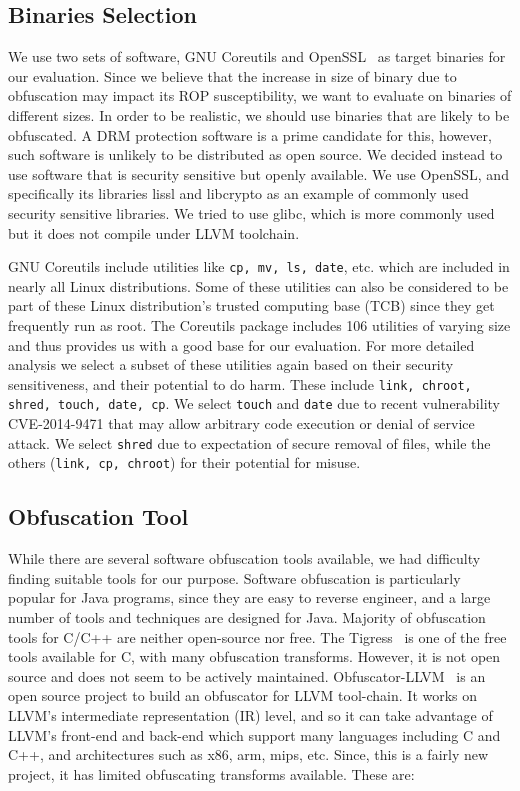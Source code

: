 \subsection{Binaries Selection}
\label{sec:sampleselect}
We use two sets of software, GNU Coreutils \cite{coreutilsdd} and 
OpenSSL~\cite{webOpenssl} as target binaries for our evaluation. Since we 
believe that the increase in size of binary due to obfuscation may impact 
its ROP susceptibility, we want to evaluate on binaries of different 
sizes. In order to be realistic, we should use binaries that are likely to 
be obfuscated. A DRM protection software is a prime candidate for this, 
however, such software is unlikely to be distributed as open source. We 
decided instead to use software that is security sensitive but openly 
available. We use OpenSSL, and specifically its libraries lissl and 
libcrypto as an example of commonly used security sensitive libraries. We 
tried to use glibc, which is more commonly used but it does not compile 
under LLVM toolchain. 

GNU Coreutils include utilities like \texttt{cp, mv, ls, date}, etc. which 
are included in nearly all Linux distributions. Some of these utilities 
can also be considered to be part of these Linux distribution's trusted 
computing base (TCB) since they get frequently run as root. The Coreutils 
package includes 106 utilities of varying size and thus provides us with a 
good base for our evaluation. For more detailed analysis we select a 
subset of these utilities again based on their security sensitiveness, and 
their potential to do harm. These include \texttt{link, chroot, shred, 
touch, date, cp}. We select \texttt{touch} and \texttt{date} due to recent 
vulnerability CVE-2014-9471 that may allow arbitrary code execution or 
denial of service attack. We select \texttt{shred} due to expectation of 
secure removal of files, while the others (\texttt{link, cp, chroot}) for 
their potential for misuse.


\subsection{Obfuscation Tool}
\label{sec:obfllvm}
While there are several software obfuscation tools available, we had 
difficulty finding suitable tools for our purpose. Software obfuscation is 
particularly popular for Java programs, since they are easy to reverse 
engineer, and a large number of tools and techniques are designed for 
Java. Majority of obfuscation tools for C/C++ are neither open-source nor 
free. The Tigress~\cite{webTigress} is one of the free tools available for 
C, with many obfuscation transforms. However, it is not open source and 
does not seem to be actively maintained. 
Obfuscator-LLVM~\cite{webLLVMobfusc} is an open source project to build an 
obfuscator for LLVM tool-chain. It works on LLVM's intermediate 
representation (IR) level, and so it can take advantage of LLVM's 
front-end and back-end which support many languages including C and C++, 
and architectures such as x86, arm, mips, etc. Since, this is a fairly new 
project, it has limited obfuscating transforms available. These are:

